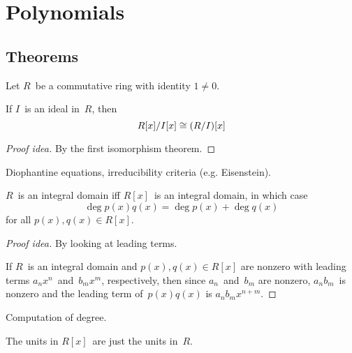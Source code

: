 %
%
\section{Polynomials}
\subsection*{Theorems}
Let \(R\)~be a commutative ring with identity \(1\ne0\).
\begin{thm}
If \(I\)~is an ideal in~\(R\), then
\[R[x]/I[x]\cong(R/I)[x]\]
\end{thm}
\begin{proof}[Proof idea]
By the first isomorphism theorem.
\end{proof}
\begin{app}
Diophantine equations, irreducibility criteria (e.g. Eisenstein).
\end{app}

\begin{thm}
\(R\)~is an integral domain iff \(R[x]\)~is an integral domain, in which case
\[\deg p(x)q(x)=\deg p(x)+\deg q(x)\]
for all \(p(x),q(x)\in R[x]\).
\end{thm}
\begin{proof}[Proof idea]
By looking at leading terms.

If \(R\)~is an integral domain and \(p(x),q(x)\in R[x]\) are nonzero with leading terms \(a_nx^n\)~and~\(b_m x^m\), respectively, then since \(a_n\)~and~\(b_m\) are nonzero, \(a_nb_m\)~is nonzero and the leading term of~\(p(x)q(x)\) is \(a_nb_m x^{n+m}\).
\end{proof}
\begin{app}
Computation of degree.
\end{app}
\begin{cor}
The units in \(R[x]\)~are just the units in~\(R\).
\end{cor}

